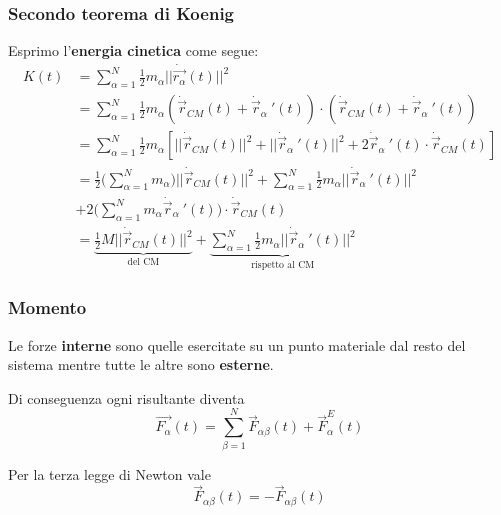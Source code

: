 \subsubsection{Secondo teorema di Koenig} Esprimo l'\textbf{energia cinetica} come segue:
\begin{equation}
	\label{eq:koenig2}
	\begin{split}
		K(t) & = \sum_{\alpha=1}^N \frac{1}{2}m_\alpha \lvert\lvert \dot{\vec{r_\alpha}}(t) \rvert\rvert^2 \\
		& = \sum_{\alpha=1}^N \frac{1}{2}m_\alpha (\dot{\vec{r}}_{CM}(t) + \dot{\vec{r}}_\alpha\:'(t))\cdot (\dot{\vec{r}}_{CM}(t) + \dot{\vec{r}}_\alpha \: '(t)) \\
		& = \sum_{\alpha=1}^N \frac{1}{2} m_\alpha [\lvert\lvert \dot{\vec{r}}_{CM}(t) \rvert\rvert ^2 + \lvert\lvert \dot{\vec{r}}_{\alpha}\:'(t)\rvert\rvert^2 + 2 \dot{\vec{r}}_\alpha\:'(t) \cdot \dot{\vec{r}}_{CM}(t)] \\
		& = \frac{1}{2}\bigg(\sum_{\alpha=1}^N m_\alpha\bigg) \lvert\lvert \dot{\vec{r}}_{CM}(t) \rvert\rvert^2 + \sum_{\alpha=1}^N \frac{1}{2}m_\alpha \lvert\lvert \dot{\vec{r}}_\alpha\:'(t) \rvert\rvert^2 \\
		& + 2 \bigg(\sum_{\alpha=1}^N m_\alpha \dot{\vec{r}}_\alpha\:'(t)\bigg) \cdot \dot{\vec{r}}_{CM}(t) \\
		& = \underbrace{\frac{1}{2} M \lvert\lvert \dot{\vec{r}}_{CM}(t)\rvert\rvert^2}_{\text{del CM}} + \underbrace{\sum_{\alpha=1}^N \frac{1}{2}m_\alpha \lvert\lvert \dot{\vec{r}}_\alpha\:'(t) \rvert\rvert ^2}_{\text{rispetto al CM}}
	\end{split}
\end{equation}

\subsubsection{Momento}
\begin{definition}
	Le forze \textbf{interne} sono quelle esercitate su un punto materiale dal resto del sistema mentre tutte le altre sono \textbf{esterne}.
\end{definition}
Di conseguenza ogni risultante diventa
\begin{equation}
	\label{eq:risultante}
	\vec{F_\alpha}(t) = \sum_{\beta=1}^{N}\vec{F}_{\alpha\beta}(t) + \vec{F}_\alpha^E(t)
\end{equation}

\begin{observation}
	\label{oss:253}
	Per la terza legge di Newton vale
	\begin{equation}
		\vec{F}_{\alpha\beta}(t) = -\vec{F}_{\alpha\beta}(t)
	\end{equation}
\end{observation}

